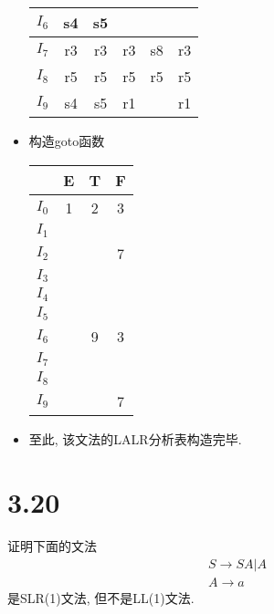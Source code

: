 \documentclass[UTF8]{article}
\begin{document}
\begin{itemize}
\begin{center}
\begin{tabular}{|c|c|c|c|c|c|}
	\hline
	$I_6$ & s4 & s5 &  &  &  \\
	\hline
	$I_7$ & r3 & r3 & r3 & s8 & r3 \\
	\hline
	$I_8$ & r5 & r5 & r5 & r5 & r5 \\
	\hline
	$I_9$ & s4 & s5 & r1 &  & r1 \\
	\hline
	\end{tabular}
	\end{center}
\item 构造goto函数
	\begin{center}
	\begin{tabular}{|c|c|c|c|}
	\hline
 & E & T & F \\
	\hline
	$I_0$ & 1 & 2 & 3 \\
	\hline
	$I_1$ &  &  &  \\
	\hline
	$I_2$ &  &  & 7 \\
	\hline
	$I_3$ &  &  &  \\
	\hline
	$I_4$ &  &  &  \\
	\hline
	$I_5$ &  &  &  \\
	\hline
	$I_6$ &  & 9 & 3 \\
	\hline
	$I_7$ &  &  &  \\
	\hline
	$I_8$ &  &  &  \\
	\hline
	$I_9$ &  &  & 7 \\
	\hline
	\end{tabular}
	\end{center}
\item 至此, 该文法的LALR分析表构造完毕.
\end{itemize}


\newpage
\section*{3.20}
\noindent 证明下面的文法
$$\begin{array}{l}
S\rightarrow SA|A\\
A\rightarrow a
\end{array}$$
是SLR(1)文法, 但不是LL(1)文法.\\
\end{document}
